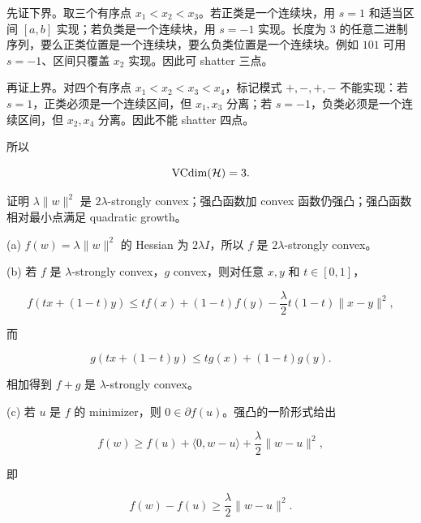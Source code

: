 \solution
先证下界。取三个有序点 \(x_1<x_2<x_3\)。若正类是一个连续块，用 \(s=1\) 和适当区间 \([a,b]\) 实现；若负类是一个连续块，用 \(s=-1\) 实现。长度为 \(3\) 的任意二进制序列，要么正类位置是一个连续块，要么负类位置是一个连续块。例如 \(101\) 可用 \(s=-1\)、区间只覆盖 \(x_2\) 实现。因此可 shatter 三点。

再证上界。对四个有序点 \(x_1<x_2<x_3<x_4\)，标记模式 \(+,-,+,-\) 不能实现：若 \(s=1\)，正类必须是一个连续区间，但 \(x_1,x_3\) 分离；若 \(s=-1\)，负类必须是一个连续区间，但 \(x_2,x_4\) 分离。因此不能 shatter 四点。

所以

\[
  \operatorname{VCdim}(\mathcal{H})=3.
\]

\begin{examproblem}[A10：强凸性的三个性质]
证明 \(\lambda\|w\|^2\) 是 \(2\lambda\)-strongly convex；强凸函数加 convex 函数仍强凸；强凸函数相对最小点满足 quadratic growth。
\end{examproblem}

\solution
(a) \(f(w)=\lambda\|w\|^2\) 的 Hessian 为 \(2\lambda I\)，所以 \(f\) 是 \(2\lambda\)-strongly convex。

(b) 若 \(f\) 是 \(\lambda\)-strongly convex，\(g\) convex，则对任意 \(x,y\) 和 \(t\in[0,1]\)，

\[
  f(tx+(1-t)y)
  \le
  tf(x)+(1-t)f(y)-\frac{\lambda}{2}t(1-t)\|x-y\|^2,
\]

而

\[
  g(tx+(1-t)y)\le tg(x)+(1-t)g(y).
\]

相加得到 \(f+g\) 是 \(\lambda\)-strongly convex。

(c) 若 \(u\) 是 \(f\) 的 minimizer，则 \(0\in\partial f(u)\)。强凸的一阶形式给出

\[
  f(w)\ge f(u)+\langle 0,w-u\rangle+\frac{\lambda}{2}\|w-u\|^2,
\]

即

\[
  f(w)-f(u)\ge \frac{\lambda}{2}\|w-u\|^2.
\]

